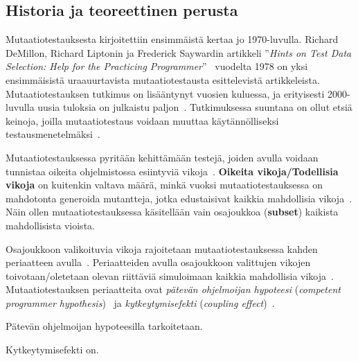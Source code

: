 \documentclass[finnish, grading]{tktltiki2}
\theoremstyle{definition}
\theoremstyle{remark}
\begin{document}
\subsection{Historia ja teoreettinen perusta}

Mutaatiotestauksesta kirjoitettiin ensimmäistä kertaa jo 1970-luvulla. Richard DeMillon, Richard Liptonin ja Frederick Saywardin artikkeli ''\textit{Hints on Test Data Selection: Help for the Practicing Programmer}''~\cite{DeMillo:Lipton:Sayward:1978} vuodelta 1978 on yksi ensimmäisistä uraauurtavista mutaatiotestausta esittelevistä artikkeleista. Mutaatiotestauksen tutkimus on lisääntynyt vuosien kuluessa, ja erityisesti 2000-luvulla uusia tuloksia on julkaistu paljon~\cite[s. 1102]{Offutt:2011}. Tutkimuksessa suuntana on ollut etsiä keinoja, joilla mutaatiotestaus voidaan muuttaa käytännölliseksi testausmenetelmäksi~\cite[s. 649]{Jia:Harman:2011}. 

Mutaatiotestauksessa pyritään kehittämään testejä, joiden avulla voidaan tunnistaa oikeita ohjelmistossa esiintyviä vikoja~\cite[s. 650]{Jia:Harman:2011}. \textbf{Oikeita vikoja/Todellisia vikoja} on kuitenkin valtava määrä, minkä vuoksi mutaatiotestauksessa on mahdotonta generoida mutantteja, jotka edustaisivat kaikkia mahdollisia vikoja~\cite[s. 650]{Jia:Harman:2011}. Näin ollen mutaatiotestauksessa käsitellään vain osajoukkoa (\textbf{subset}) kaikista mahdollisista vioista.

Osajoukkoon valikoituvia vikoja rajoitetaan mutaatiotestauksessa kahden periaatteen avulla~\cite[s. 5]{Offutt:1992:Coupling}. Periaatteiden avulla osajoukkoon valittujen vikojen toivotaan/oletetaan olevan riittäviä simuloimaan kaikkia mahdollisia vikoja~\cite[s. 650]{Jia:Harman:2011}. Mutaatiotestauksen periaatteita ovat \textit{pätevän ohjelmoijan hypoteesi} (\textit{competent programmer hypothesis})~\cite[s. 34]{DeMillo:Lipton:Sayward:1978} ja \textit{kytkeytymisefekti} (\textit{coupling effect})~\cite[s. 35]{DeMillo:Lipton:Sayward:1978}.

Pätevän ohjelmoijan hypoteesilla tarkoitetaan.

Kytkeytymisefekti on.

\end{document}
